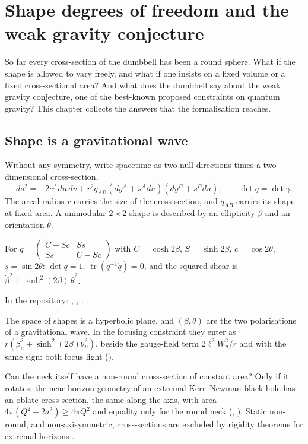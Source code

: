 \chapter[Shape degrees of freedom and the weak gravity conjecture]{Shape degrees of freedom and the weak gravity conjecture}\label{ch:shape-wgc}

\begin{questionbox}
So far every cross-section of the dumbbell has been a round sphere. What if the shape is allowed to vary freely, and what if one insists on a fixed volume or a fixed cross-sectional area? And what does the dumbbell say about the weak gravity conjecture, one of the best-known proposed constraints on quantum gravity? This chapter collects the answers that the formalisation reaches.
\end{questionbox}

\section{Shape is a gravitational wave}

Without any symmetry, write spacetime as two null directions times a two-dimensional cross-section,
\[
ds^2=-2e^f\,du\,dv+r^2q_{AB}(dy^A+s^Adu)(dy^B+s^Bdu),\qquad\det q=\det\gamma .
\]
The areal radius $r$ carries the size of the cross-section, and $q_{AB}$ carries its shape at fixed area. A unimodular $2\times2$ shape is described by an ellipticity $\beta$ and an orientation $\theta$.

\begin{proposition}\proved
For $q=\begin{pmatrix}C+Sc&Ss\\ Ss&C-Sc\end{pmatrix}$ with $C=\cosh2\beta$, $S=\sinh2\beta$, $c=\cos2\theta$, $s=\sin2\theta$: $\det q=1$, $\operatorname{tr}(q^{-1}\dot q)=0$, and the squared shear is $\dot\beta^2+\sinh^2(2\beta)\,\dot\theta^2$.
\end{proposition}
\noindent In the repository: , , .

The space of shapes is a hyperbolic plane, and $(\beta,\theta)$ are the two polarisations of a gravitational wave. In the focusing constraint they enter as $r(\beta_u^2+\sinh^2(2\beta)\theta_u^2)$, beside the gauge-field term $2\ell^2W_u^2/r$ and with the same sign: both focus light ().

Can the neck itself have a non-round cross-section of constant area? Only if it rotates: the near-horizon geometry of an extremal Kerr--Newman black hole has an oblate cross-section, the same along the axis, with area $4\pi(Q^2+2a^2)\ge4\pi Q^2$ and equality only for the round neck (, ). Static non-round, and non-axisymmetric, cross-sections are excluded by rigidity theorems for extremal horizons \external.

